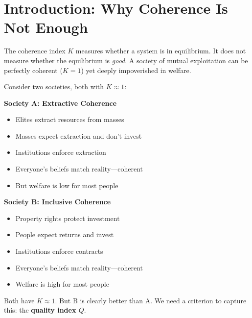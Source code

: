 
\section{Introduction: Why Coherence Is Not Enough}
\label{sec:fepsde-intro}


The coherence index $K$ measures whether a system is in equilibrium.
It does not measure whether the equilibrium is \emph{good}.
A society of mutual exploitation can be perfectly coherent ($K = 1$)
yet deeply impoverished in welfare.

\begin{intuition}
Consider two societies, both with $K \approx 1$:

\textbf{Society A: Extractive Coherence}
\begin{itemize}[nosep]
  \item Elites extract resources from masses
  \item Masses expect extraction and don't invest
  \item Institutions enforce extraction
  \item Everyone's beliefs match reality---coherent
  \item But welfare is low for most people
\end{itemize}

\textbf{Society B: Inclusive Coherence}
\begin{itemize}[nosep]
  \item Property rights protect investment
  \item People expect returns and invest
  \item Institutions enforce contracts
  \item Everyone's beliefs match reality---coherent
  \item Welfare is high for most people
\end{itemize}

Both have $K \approx 1$. But B is clearly better than A.
We need a criterion to capture this: the \textbf{quality index $Q$}.
\end{intuition}

